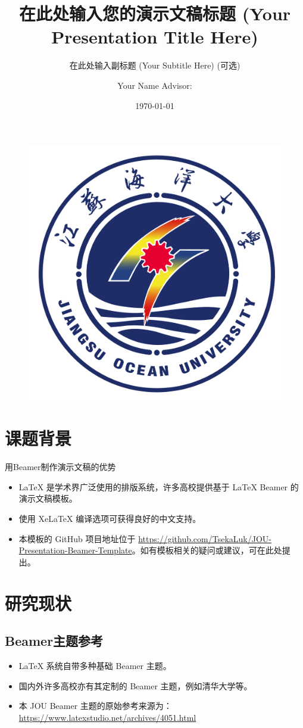 \documentclass{beamer} %
\author[PresenterName]{Your Name \texorpdfstring{\newline Advisor: \advisorname}{, Advisor: \advisorname}} %
\title{在此处输入您的演示文稿标题 (Your Presentation Title Here)} %
\subtitle{在此处输入副标题 (Your Subtitle Here) (可选)} %
\institute{\myinstitution} %
\date{\today} %
\begin{document}
\kaishu %
\begin{frame}
    \titlepage %
    \begin{figure}[htpb]
        \centering
        \vspace{-6mm}
        \includegraphics[width=0.18\linewidth]{pic/JOU_logo.jpg} %
    \end{figure}
\end{frame}

\begin{frame}
\tableofcontents[sectionstyle=show,subsectionstyle=show/shaded/hide,subsubsectionstyle=show/shaded/hide] %
\end{frame}

\section{课题背景}

\begin{frame}{用Beamer制作演示文稿的优势}
    \begin{itemize}[<+-| alert@+>]
        \item \LaTeX{} 是学术界广泛使用的排版系统，许多高校提供基于 \LaTeX{} Beamer 的演示文稿模板。
        \item 使用 Xe\LaTeX{} 编译选项可获得良好的中文支持。
        \item 本模板的 GitHub 项目地址位于 \url{https://github.com/TsekaLuk/JOU-Presentation-Beamer-Template}。如有模板相关的疑问或建议，可在此处提出。
    \end{itemize}
\end{frame}

\section{研究现状}

\subsection{Beamer主题参考}

\begin{frame}
    \begin{itemize}
        \item \LaTeX{} 系统自带多种基础 Beamer 主题。
        \item 国内外许多高校亦有其定制的 Beamer 主题，例如清华大学等。
        \item 本 JOU Beamer 主题的原始参考来源为：\newline \url{https://www.latexstudio.net/archives/4051.html}
    \end{itemize}
\end{frame}
\end{document}
